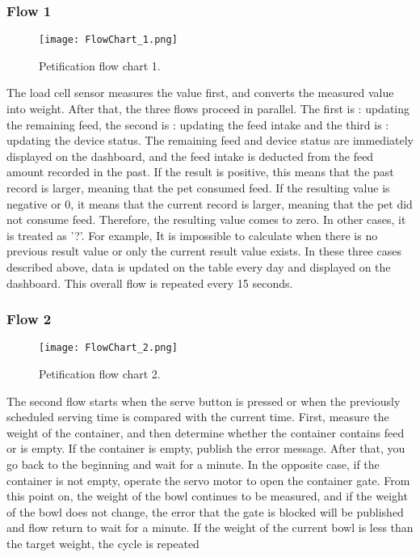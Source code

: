 \documentclass[conference]{IEEEtran}
\begin{document}
\subsubsection{Flow 1}
\begin{figure}[htbp]
\centerline{\texttt{[image: FlowChart\_1.png]}}
\caption{Petification flow chart 1.}
\label{fig}
\end{figure}
The load cell sensor measures the value first, and converts the measured value into weight. After that, the three flows proceed in parallel. The first is : updating the remaining feed, the second is : updating the feed intake and the third is : updating the device status.
The remaining feed and device status are immediately displayed on the dashboard, and the feed intake is deducted from the feed amount recorded in the past. If the result is positive, this means that the past record is larger, meaning that the pet consumed feed.
If the resulting value is negative or 0, it means that the current record is larger, meaning that the pet did not consume feed. Therefore, the resulting value comes to zero. In other cases, it is treated as '?'. For example, It is impossible to calculate when there is no previous result value or only the current result value exists. In these three cases described above, data is updated on the table every day and displayed on the dashboard. This overall flow is repeated every 15 seconds.

\hfill \break
\subsubsection{Flow 2}
\begin{figure}[htbp]
\centerline{\texttt{[image: FlowChart\_2.png]}}
\caption{Petification flow chart 2.}
\label{fig}
\end{figure}
The second flow starts when the serve button is pressed or when the previously scheduled serving time is compared with the current time.
First, measure the weight of the container, and then determine whether the container contains feed or is empty. If the container is empty, publish the error message. After that, you go back to the beginning and wait for a minute.
In the opposite case, if the container is not empty, operate the servo motor to open the container gate. From this point on, the weight of the bowl continues to be measured, and if the weight of the bowl does not change, the error that the gate is blocked will be published and flow return to wait for a minute.
If the weight of the current bowl is less than the target weight, the cycle is repeated
\end{document}
